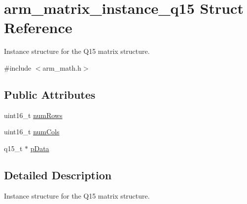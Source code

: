 \hypertarget{structarm__matrix__instance__q15}{\section{arm\-\_\-matrix\-\_\-instance\-\_\-q15 Struct Reference}
\label{structarm__matrix__instance__q15}
}


Instance structure for the Q15 matrix structure.  




{\ttfamily \#include $<$arm\-\_\-math.\-h$>$}

\subsection*{Public Attributes}
\begin{DoxyCompactItemize}
\item 
uint16\-\_\-t \hyperlink{structarm__matrix__instance__q15_a9bac6ed54be287c4d4f01a1a28be65f5}{num\-Rows}
\item 
uint16\-\_\-t \hyperlink{structarm__matrix__instance__q15_acbbce67ba058d8e1c867c71d57288c97}{num\-Cols}
\item 
q15\-\_\-t $\ast$ \hyperlink{structarm__matrix__instance__q15_a6da33a5553e634787d0f515cf8d724af}{p\-Data}
\end{DoxyCompactItemize}


\subsection{Detailed Description}
Instance structure for the Q15 matrix structure. 


